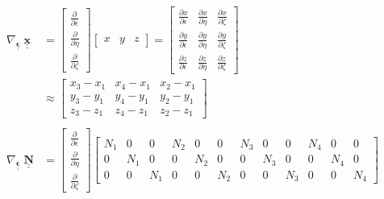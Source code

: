 \documentclass[12pt]{article}
\def\doubleunderline#1{\underline{\underline{#1}}}
\def\diffp[#1]#2{\frac{\partial#1}{\partial#2}}
\def\mt#1{\underline{\underline{\mathbf{#1}}}}
\newcommand{\nb}{\doubleunderline{\mathbf{N}}}
\begin{document}
\begin{align*}
\nabla_{\mt{\epsilon}} \; \mt{x}  &= \begin{bmatrix} \diffp[]{\epsilon} \\ \diffp[]{\eta} \\ \diffp[]{\zeta} \end{bmatrix} \begin{bmatrix} x & y & z \end{bmatrix}
=
\begin{bmatrix}
\diffp[x]{\epsilon} & \diffp[x]{\eta} & \diffp[x]{\zeta} \\
\diffp[y]{\epsilon} & \diffp[y]{\eta} & \diffp[y]{\zeta} \\
\diffp[z]{\epsilon} & \diffp[z]{\eta} & \diffp[z]{\zeta}
\end{bmatrix}
\\
& \approx
\begin{bmatrix}
	x_3 - x_1 & x_4 - x_1 & x_2 - x_1 \\
	y_3 - y_1 & y_4 - y_1 & y_2 - y_1 \\
	z_3 - z_1 & z_4 - z_1 & z_2 - z_1
\end{bmatrix}
\\ \\
\nabla_{\mt{\epsilon}} \; \nb &= \begin{bmatrix} \diffp[]{\epsilon} \\ \diffp[]{\eta} \\ \diffp[]{\zeta} \end{bmatrix}
\begin{bmatrix}
	N_1 & 0 & 0 &  N_2 & 0 & 0 &  N_3 & 0 & 0 &  N_4 & 0 & 0 \\
	0 & N_1 & 0 & 0 &  N_2 & 0 & 0 &  N_3 & 0 & 0 &  N_4 & 0 \\
	0 & 0 & N_1 & 0 & 0 &  N_2 & 0 & 0 &  N_3 & 0 & 0 &  N_4
\end{bmatrix}
\\
\end{align*}
\end{document}
